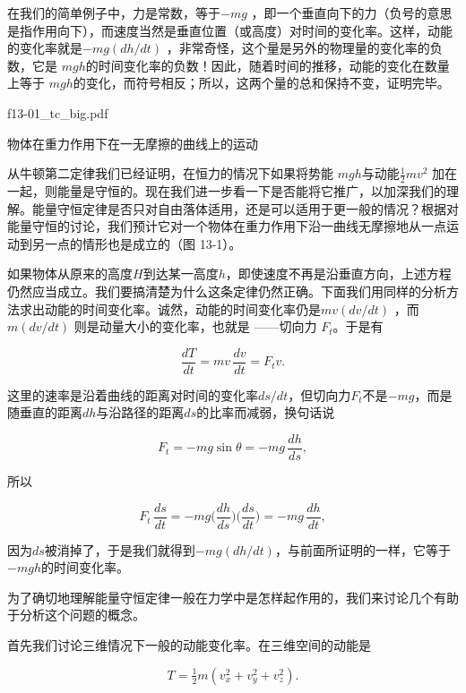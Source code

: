 \documentclass[12pt,oneside]{book}
\providecommand{\ddt}[2]{\frac{d#1}{d#2}}
\begin{document}
在我们的简单例子中，力是常数，等于$ -mg $ ，即一个垂直向下的力（负号的意思是指作用向下），而速度当然是垂直位置（或高度）对时间的变化率。这样，动能的变化率就是$ -mg(dh/dt) $ ，非常奇怪，这个量是另外的物理量的变化率的负数，它是 $ mgh $的时间变化率的负数！因此，随着时间的推移，动能的变化在数量上等于 $ mgh $的变化，而符号相反；所以，这两个量的总和保持不变，证明完毕。

\begin{fig}{f13-01_tc_big.pdf}
\caption{物体在重力作用下在一无摩擦的曲线上的运动}
\label{fig:13-1}
\end{fig}

从牛顿第二定律我们已经证明，在恒力的情况下如果将势能 $ mgh $与动能$ \tfrac{1}{2}mv^2 $  加在一起，则能量是守恒的。现在我们进一步看一下是否能将它推广，以加深我们的理解。能量守恒定律是否只对自由落体适用，还是可以适用于更一般的情况？根据对能量守恒的讨论，我们预计它对一个物体在重力作用下沿一曲线无摩擦地从一点运动到另一点的情形也是成立的（图 13-1）。

如果物体从原来的高度$H$到达某一高度$h$，即使速度不再是沿垂直方向，上述方程仍然应当成立。我们要搞清楚为什么这条定律仍然正确。下面我们用同样的分析方法求出动能的时间变化率。诚然，动能的时间变化率仍是$mv(dv/dt)  $ ，而$ m(dv/dt) $ 则是动量大小的变化率，也就是 ——切向力 $ F_t $。于是有

\begin{equation*}
\ddt{T}{t}=mv\,\ddt{v}{t}=F_tv.
\end{equation*}


这里的速率是沿着曲线的距离对时间的变化率$ds/dt$，但切向力$F_{t}$不是$-mg$，而是随垂直的距离$dh$与沿路径的距离$ds$的比率而减弱，换句话说


\begin{equation*}
F_t=-mg\sin\theta=-mg\,\ddt{h}{s},
\end{equation*}

所以


\begin{equation*}
F_t\,\ddt{s}{t}=-mg\biggl(\ddt{h}{s}\biggr)
\biggl(\ddt{s}{t}\biggr)=-mg\,\ddt{h}{t},
\end{equation*}

因为$ds$被消掉了，于是我们就得到$-mg(dh/dt)$，与前面所证明的一样，它等于$-mgh$的时间变化率。


为了确切地理解能量守恒定律一般在力学中是怎样起作用的，我们来讨论几个有助于分析这个问题的概念。


首先我们讨论三维情况下一般的动能变化率。在三维空间的动能是


\begin{equation*}
T=\tfrac{1}{2}m(v_x^2+v_y^2+v_z^2).
\end{equation*}
\end{document}
